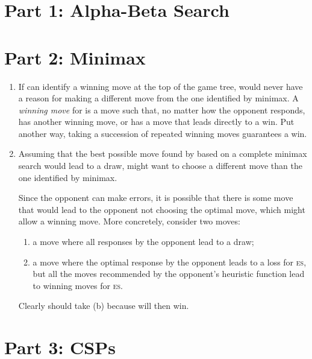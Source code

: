 \documentclass[11pt]{amsart}
\begin{document}
\maketitle

\section*{Part 1: Alpha-Beta Search}

\section*{Part 2: Minimax}

\begin{enumerate}

\item
If \es can identify a winning move at the top of the game tree, \es would
never have a reason for making a different move from the one identified by minimax.  A \emph{winning
move} for \es is a move such that, no matter how the opponent responds, \es 
has another winning move, or has a move that leads directly to a win.  Put another way, taking a
succession of repeated winning moves guarantees \es a win.

\item
Assuming that the best possible move found by \es based on a complete minimax search
would lead to a draw, \es might want to choose a different move than the one identified
by minimax.

Since the opponent can make errors, it is possible that there is some move that would lead to the
opponent not choosing the optimal move, which might allow \es a winning move.  More
concretely, consider two moves:
\begin{enumerate}
\item a move where all responses by the opponent lead to a draw;
\item a move where the optimal response by the opponent leads to a loss for \textsc{es}, but all the
moves recommended by the opponent's heuristic function lead to winning moves for \textsc{es}.
\end{enumerate}
Clearly \es should take (b) because \es will then win.

\end{enumerate}

\section*{Part 3: CSPs}
\end{document}
